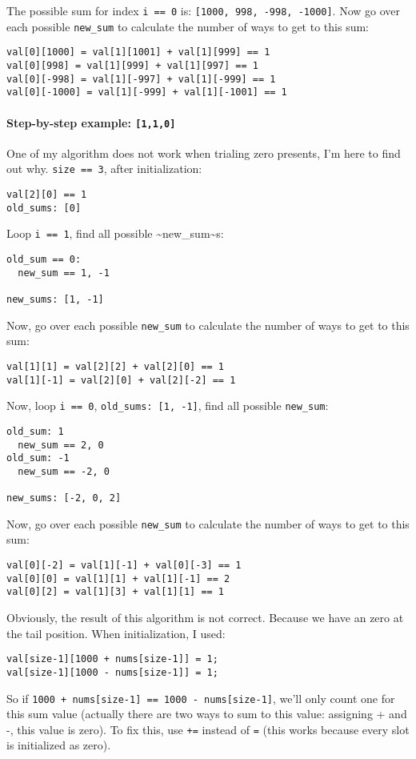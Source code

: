 \documentclass[11pt]{article}
\begin{document}
The possible sum for index \texttt{i == 0} is: \texttt{[1000, 998, -998, -1000]}. Now go over each possible \texttt{new\_sum} to calculate the number of ways to get to this sum:
\begin{Verbatim}[frame=single]
val[0][1000] = val[1][1001] + val[1][999] == 1
val[0][998] = val[1][999] + val[1][997] == 1
val[0][-998] = val[1][-997] + val[1][-999] == 1
val[0][-1000] = val[1][-999] + val[1][-1001] == 1
\end{Verbatim}
\paragraph{Step-by-step example: \texttt{[1,1,0]}}
\label{sec:org00db8f1}

One of my algorithm does not work when trialing zero presents, I'm here to find out why. \texttt{size == 3}, after initialization:
\begin{Verbatim}[frame=single]
val[2][0] == 1
old_sums: [0]
\end{Verbatim}
Loop \texttt{i == 1}, find all possible \textasciitilde{}new\_sum\textasciitilde{}s:
\begin{Verbatim}[frame=single]
old_sum == 0:
  new_sum == 1, -1

new_sums: [1, -1]
\end{Verbatim}

Now, go over each possible \texttt{new\_sum} to calculate the number of ways to get to this sum:
\begin{Verbatim}[frame=single]
val[1][1] = val[2][2] + val[2][0] == 1
val[1][-1] = val[2][0] + val[2][-2] == 1
\end{Verbatim}

Now, loop \texttt{i == 0}, \texttt{old\_sums: [1, -1]}, find all possible \texttt{new\_sum}:
\begin{Verbatim}[frame=single]
old_sum: 1
  new_sum == 2, 0
old_sum: -1
  new_sum == -2, 0

new_sums: [-2, 0, 2]
\end{Verbatim}

Now, go over each possible \texttt{new\_sum} to calculate the number of ways to get to this sum:
\begin{Verbatim}[frame=single]
val[0][-2] = val[1][-1] + val[0][-3] == 1
val[0][0] = val[1][1] + val[1][-1] == 2
val[0][2] = val[1][3] + val[1][1] == 1
\end{Verbatim}

Obviously, the result of this algorithm is not correct. Because we have an zero at the tail position. When initialization, I used:
\begin{verbatim}
val[size-1][1000 + nums[size-1]] = 1;
val[size-1][1000 - nums[size-1]] = 1;
\end{verbatim}
So if \texttt{1000 + nums[size-1] == 1000 - nums[size-1]}, we'll only count one for this sum value (actually there are two ways to sum to this value: assigning + and -, this value is zero). To fix this, use \texttt{+=} instead of \texttt{=} (this works because every slot is initialized as zero).
\end{document}
